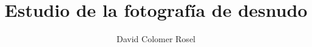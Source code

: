 \documentclass[10pt,a4paper,twoside,openright]{book}
\author{David Colomer Rosel}
\title{Estudio de la fotograf\'ia de desnudo}
\begin{document}
\maketitle
\tableofcontents







	
\printglossaries





\printindex

\end{document}
